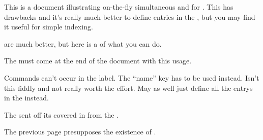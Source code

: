 \documentclass{article}
\begin{document}
This is a  document illustrating on-the-fly
simultaneous  and 
for  
. This has 
drawbacks and it's really much better to define entries in the 
, but you may find it useful for simple 
indexing.

\newpage

  are much better,
but here is a  of what you can do.

\newpage
The  must come at the end of the document 
with this usage.

\newpage
Commands can't occur in the label. The ``name'' key has to be
used instead. Isn't this fiddly and not really worth the
effort. May as well just define all the \glspl{entry} in the
 instead.

The  
 sent 
off its  covered in 
 from
the .

\newpage
The previous page presupposes the existence of 
.

\newpage

\printglossaries
\end{document}
